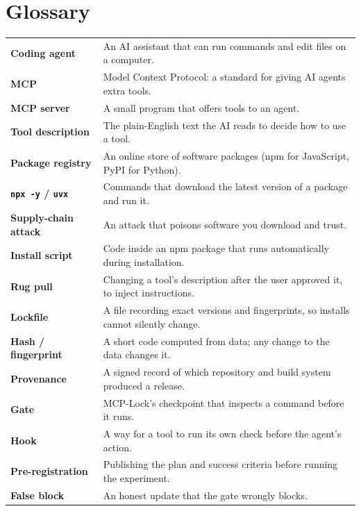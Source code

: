 \documentclass[11pt,a4paper]{article}
\newcommand{\code}[1]{\texttt{#1}}
\begin{document}
\section{Glossary}
\begin{center}
\begin{tabularx}{\textwidth}{@{}>{\bfseries}p{3.4cm}X@{}}
\toprule
Coding agent & An AI assistant that can run commands and edit files on a computer. \\
MCP & Model Context Protocol: a standard for giving AI agents extra tools. \\
MCP server & A small program that offers tools to an agent. \\
Tool description & The plain-English text the AI reads to decide how to use a tool. \\
Package registry & An online store of software packages (npm for JavaScript, PyPI for Python). \\
\code{npx -y} / \code{uvx} & Commands that download the latest version of a package and run it. \\
Supply-chain attack & An attack that poisons software you download and trust. \\
Install script & Code inside an npm package that runs automatically during installation. \\
Rug pull & Changing a tool's description after the user approved it, to inject instructions. \\
Lockfile & A file recording exact versions and fingerprints, so installs cannot silently change. \\
Hash / fingerprint & A short code computed from data; any change to the data changes it. \\
Provenance & A signed record of which repository and build system produced a release. \\
Gate & MCP-Lock's checkpoint that inspects a command before it runs. \\
Hook & A way for a tool to run its own check before the agent's action. \\
Pre-registration & Publishing the plan and success criteria before running the experiment. \\
False block & An honest update that the gate wrongly blocks. \\
\bottomrule
\end{tabularx}
\end{center}
\end{document}
